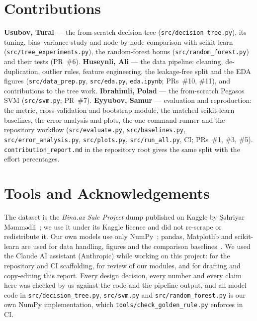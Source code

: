 \documentclass[10pt,twocolumn,a4paper]{article}
\begin{document}
\section*{Contributions}
\textbf{Usubov, Tural} --- the from-scratch decision tree
(\texttt{src/decision\_tree.py}), its tuning, bias--variance study and
node-by-node comparison with scikit-learn
(\texttt{src/tree\_experiments.py}), the random-forest bonus
(\texttt{src/random\_forest.py}) and their tests (PR~\#6).
\textbf{Huseynli, Ali} --- the data pipeline: cleaning, de-duplication,
outlier rules, feature engineering, the leakage-free split and the EDA
figures (\texttt{src/data\_prep.py}, \texttt{src/eda.py},
\texttt{eda.ipynb}; PRs~\#10, \#11), and contributions to the tree work.
\textbf{Ibrahimli, Polad} --- the from-scratch Pegasos SVM
(\texttt{src/svm.py}; PR~\#7).
\textbf{Eyyubov, Samur} --- evaluation and reproduction: the metric,
cross-validation and bootstrap module, the matched scikit-learn baselines,
the error analysis and plots, the one-command runner and the repository
workflow (\texttt{src/evaluate.py}, \texttt{src/baselines.py},
\texttt{src/error\_analysis.py}, \texttt{src/plots.py},
\texttt{src/run\_all.py}, CI; PRs~\#1, \#3, \#5).
\texttt{contribution\_report.md} in the repository root gives the same split
with the effort percentages.

\section*{Tools and Acknowledgements}
The dataset is the \emph{Bina.az Sale Project} dump published on Kaggle by
Şəhriyar Məmmədli~\cite{dataset}; we use it
under its Kaggle licence and did not re-scrape or redistribute it. Our own
models use only NumPy~\cite{numpy}; pandas, Matplotlib and scikit-learn are
used for data handling, figures and the comparison baselines~\cite{sklearn}.
We used the Claude AI assistant (Anthropic) while working on this project: for
the repository and CI scaffolding, for review of our modules, and for drafting
and copy-editing this report. Every design decision, every number and every
claim here was checked by us against the code and the pipeline output, and all
model code in \texttt{src/decision\_tree.py}, \texttt{src/svm.py} and
\texttt{src/random\_forest.py} is our own NumPy implementation, which
\texttt{tools/check\_golden\_rule.py} enforces in CI.
\end{document}

